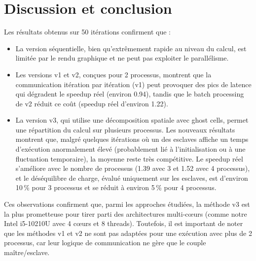 \documentclass[a4paper,13pt]{book}
\begin{document}
\section{Discussion et conclusion}
Les résultats obtenus sur 50 itérations confirment que :
\begin{itemize}
    \item La version séquentielle, bien qu'extrêmement rapide au niveau du calcul, est limitée par le rendu graphique et ne peut pas exploiter le parallélisme.
    \item Les versions v1 et v2, conçues pour 2 processus, montrent que la communication itération par itération (v1) peut provoquer des pics de latence qui dégradent le speedup réel (environ 0.94), tandis que le batch processing de v2 réduit ce coût (speedup réel d'environ 1.22).
    \item La version v3, qui utilise une décomposition spatiale avec ghost cells, permet une répartition du calcul sur plusieurs processus. Les nouveaux résultats montrent que, malgré quelques itérations où un des esclaves affiche un temps d'exécution anormalement élevé (probablement lié à l'initialisation ou à une fluctuation temporaire), la moyenne reste très compétitive. Le speedup réel s'améliore avec le nombre de processus (1.39 avec 3 et 1.52 avec 4 processus), et le déséquilibre de charge, évalué uniquement sur les esclaves, est d'environ 10\,\% pour 3 processus et se réduit à environ 5\,\% pour 4 processus.
\end{itemize}

Ces observations confirment que, parmi les approches étudiées, la méthode v3 est la plus prometteuse pour tirer parti des architectures multi-cœurs (comme notre Intel i5-10210U avec 4 c{\oe}urs et 8 threads). Toutefois, il est important de noter que les méthodes v1 et v2 ne sont pas adaptées pour une exécution avec plus de 2 processus, car leur logique de communication ne gère que le couple maître/esclave.
\end{document}
